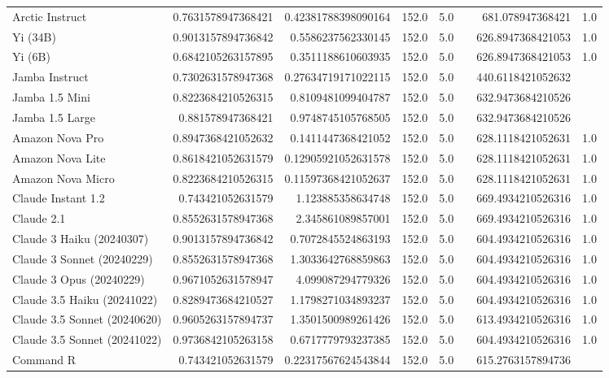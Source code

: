 \begin{table}[htp]
{\begin{tabular}{lrrrrrrr}
Arctic Instruct & 0.7631578947368421 & 0.42381788398090164 & 152.0 & 5.0 &  & 681.078947368421 & 1.0 \\
Yi (34B) & 0.9013157894736842 & 0.5586237562330145 & 152.0 & 5.0 &  & 626.8947368421053 & 1.0 \\
Yi (6B) & 0.6842105263157895 & 0.3511188610603935 & 152.0 & 5.0 &  & 626.8947368421053 & 1.0 \\
Jamba Instruct & 0.7302631578947368 & 0.27634719171022115 & 152.0 & 5.0 &  & 440.6118421052632 &  \\
Jamba 1.5 Mini & 0.8223684210526315 & 0.8109481099404787 & 152.0 & 5.0 &  & 632.9473684210526 &  \\
Jamba 1.5 Large & 0.881578947368421 & 0.9748745105768505 & 152.0 & 5.0 &  & 632.9473684210526 &  \\
Amazon Nova Pro & 0.8947368421052632 & 0.1411447368421052 & 152.0 & 5.0 &  & 628.1118421052631 & 1.0 \\
Amazon Nova Lite & 0.8618421052631579 & 0.12905921052631578 & 152.0 & 5.0 &  & 628.1118421052631 & 1.0 \\
Amazon Nova Micro & 0.8223684210526315 & 0.11597368421052637 & 152.0 & 5.0 &  & 628.1118421052631 & 1.0 \\
Claude Instant 1.2 & 0.743421052631579 & 1.123885358634748 & 152.0 & 5.0 &  & 669.4934210526316 & 1.0 \\
Claude 2.1 & 0.8552631578947368 & 2.345861089857001 & 152.0 & 5.0 &  & 669.4934210526316 & 1.0 \\
Claude 3 Haiku (20240307) & 0.9013157894736842 & 0.7072845524863193 & 152.0 & 5.0 &  & 604.4934210526316 & 1.0 \\
Claude 3 Sonnet (20240229) & 0.8552631578947368 & 1.3033642768859863 & 152.0 & 5.0 &  & 604.4934210526316 & 1.0 \\
Claude 3 Opus (20240229) & 0.9671052631578947 & 4.099087294779326 & 152.0 & 5.0 &  & 604.4934210526316 & 1.0 \\
Claude 3.5 Haiku (20241022) & 0.8289473684210527 & 1.1798271034893237 & 152.0 & 5.0 &  & 604.4934210526316 & 1.0 \\
Claude 3.5 Sonnet (20240620) & 0.9605263157894737 & 1.3501500989261426 & 152.0 & 5.0 &  & 613.4934210526316 & 1.0 \\
Claude 3.5 Sonnet (20241022) & 0.9736842105263158 & 0.6717779793237385 & 152.0 & 5.0 &  & 604.4934210526316 & 1.0 \\
Command R & 0.743421052631579 & 0.22317567624543844 & 152.0 & 5.0 &  & 615.2763157894736 &  \\

\end{tabular}}
\end{table}
